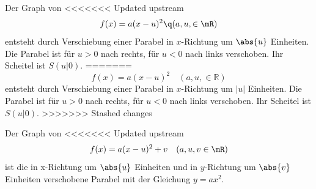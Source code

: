 \documentclass[%
<<<<<<< Updated upstream
11pt,%
twoside,%
titlepage,%
german,%
=======
11pt,%
twoside,%
titlepage,%
swissgerman,%
>>>>>>> Stashed changes
headsepline%
]{scrartcl}
\theoremstyle{definition}
\theoremstyle{plain}
\begin{document}
Der Graph von
<<<<<<< Updated upstream
$$f(x)=a(x-u)^2\q(a,u,\in\mR)$$
entsteht durch Verschiebung einer Parabel in $x$-Richtung um $\abs{u}$ Einheiten. Die Parabel ist f\"ur $u>0$ nach rechts, f\"ur $u<0$ nach links verschoben. Ihr Scheitel ist $S(u|0)$.
=======
$$f(x)=a(x-u)^2\quad(a,u,\in\mathbb{R})$$
entsteht durch Verschiebung einer Parabel in $x$-Richtung um $|u|$ Einheiten. Die Parabel ist f\"ur $u>0$ nach rechts, f\"ur $u<0$ nach links verschoben. Ihr Scheitel ist $S(u|0)$.
>>>>>>> Stashed changes

Der
Graph von
<<<<<<< Updated upstream
$$f(x)=a(x-u)^2+v\quad(a,u,v\in\mR)$$
ist die in x-Richtung um $\abs{u}$ Einheiten und in $y$-Richtung um $\abs{v}$ Einheiten verschobene Parabel mit der Gleichung $y=ax^2$.
\end{document}
